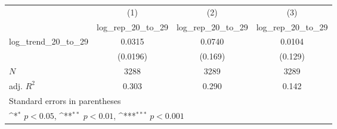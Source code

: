 {
\def\sym#1{\ifmmode^{#1}\else\(^{#1}\)\fi}
\begin{tabular}{l*{3}{c}}
\hline\hline
            &\multicolumn{1}{c}{(1)}&\multicolumn{1}{c}{(2)}&\multicolumn{1}{c}{(3)}\\
            &\multicolumn{1}{c}{log\_rep\_20\_to\_29}&\multicolumn{1}{c}{log\_rep\_20\_to\_29}&\multicolumn{1}{c}{log\_rep\_20\_to\_29}\\
\hline
log\_trend\_20\_to\_29&      0.0315         &      0.0740         &      0.0104         \\
            &    (0.0196)         &     (0.169)         &     (0.129)         \\
\hline
\(N\)       &        3288         &        3289         &        3289         \\
adj. \(R^{2}\)&       0.303         &       0.290         &       0.142         \\
\hline\hline
\multicolumn{4}{l}{\footnotesize Standard errors in parentheses}\\
\multicolumn{4}{l}{\footnotesize \sym{*} \(p<0.05\), \sym{**} \(p<0.01\), \sym{***} \(p<0.001\)}\\
\end{tabular}
}

